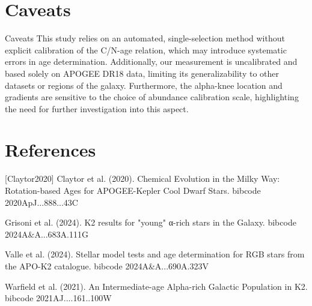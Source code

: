 \documentclass[twocolumn]{aastex631}
\begin{document}
\section{Caveats}
Caveats
This study relies on an automated, single-selection method without explicit calibration of the C/N-age relation, which may introduce systematic errors in age determination. Additionally, our measurement is uncalibrated and based solely on APOGEE DR18 data, limiting its generalizability to other datasets or regions of the galaxy. Furthermore, the alpha-knee location and gradients are sensitive to the choice of abundance calibration scale, highlighting the need for further investigation into this aspect.
\section*{References}
\footnotesize
[Claytor2020] Claytor et al. (2020). Chemical Evolution in the Milky Way: Rotation-based Ages for APOGEE-Kepler Cool Dwarf Stars. bibcode 2020ApJ...888...43C \par [Grisoni2024] Grisoni et al. (2024). K2 results for "young" α-rich stars in the Galaxy. bibcode 2024A\&A...683A.111G \par [Valle2024] Valle et al. (2024). Stellar model tests and age determination for RGB stars from the APO-K2 catalogue. bibcode 2024A\&A...690A.323V \par [Warfield2021] Warfield et al. (2021). An Intermediate-age Alpha-rich Galactic Population in K2. bibcode 2021AJ....161..100W
\end{document}
